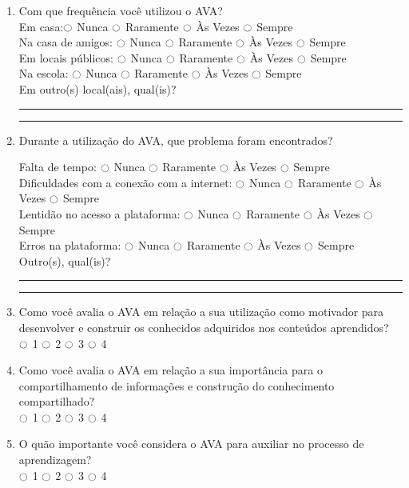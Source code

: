\begin{enumerate}

  \item Com que frequência você utilizou o AVA? \\
  Em casa:$\ocircle$ Nunca  $\ocircle$ Raramente  $\ocircle$ Às Vezes  $\ocircle$ Sempre \\
  Na casa de amigos: $\ocircle$ Nunca  $\ocircle$ Raramente  $\ocircle$ Às Vezes  $\ocircle$ Sempre \\
  Em locais públicos: $\ocircle$ Nunca  $\ocircle$ Raramente  $\ocircle$ Às Vezes  $\ocircle$ Sempre \\
  Na escola: $\ocircle$ Nunca  $\ocircle$ Raramente  $\ocircle$ Às Vezes  $\ocircle$ Sempre \\
  Em outro(s) local(ais), qual(is)? \\
  \noindent\rule{\textwidth}{0.4pt}
  \noindent\rule{\textwidth}{0.4pt}

  \item Durante a utilização do AVA, que problema foram encontrados?

  Falta de tempo: $\ocircle$ Nunca  $\ocircle$ Raramente  $\ocircle$ Às Vezes  $\ocircle$ Sempre \\
  Dificuldades com a conexão com a internet: $\ocircle$ Nunca  $\ocircle$ Raramente  $\ocircle$ Às Vezes  $\ocircle$ Sempre \\
  Lentidão no acesso a plataforma: $\ocircle$ Nunca  $\ocircle$ Raramente  $\ocircle$ Às Vezes  $\ocircle$ Sempre \\
  Erros na plataforma: $\ocircle$ Nunca  $\ocircle$ Raramente  $\ocircle$ Às Vezes  $\ocircle$ Sempre \\
  Outro(s), qual(is)? \\
  \noindent\rule{\textwidth}{0.4pt}
  \noindent\rule{\textwidth}{0.4pt}

  \item Como você avalia o AVA em relação a sua utilização como motivador para desenvolver e construir os conhecidos adquiridos nos conteúdos aprendidos? \\ 
  $\ocircle$ 1  $\ocircle$ 2 $\ocircle$ 3 $\ocircle$ 4 

  \item Como você avalia o AVA em relação a sua importância para o compartilhamento de informações e construção do conhecimento compartilhado? \\ 
  $\ocircle$ 1  $\ocircle$ 2 $\ocircle$ 3 $\ocircle$ 4 

  \item O quão importante você considera o AVA para auxiliar no processo de aprendizagem? \\ 
  $\ocircle$ 1  $\ocircle$ 2 $\ocircle$ 3 $\ocircle$ 4 

\end{enumerate}

